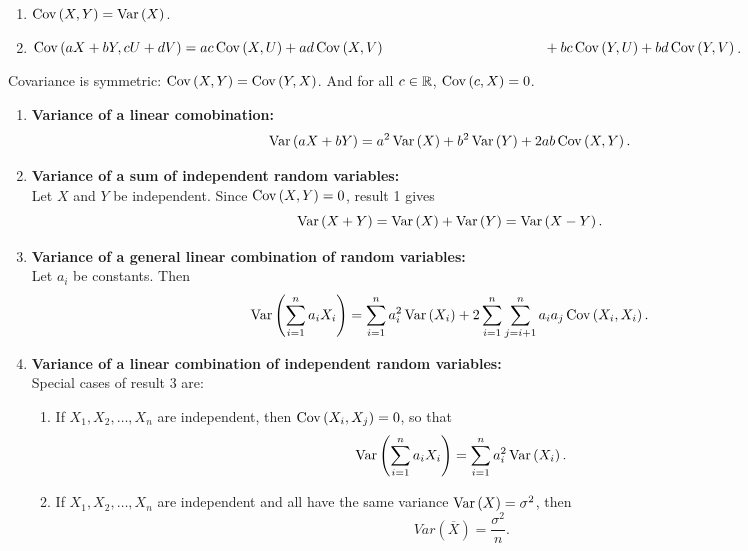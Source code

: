 \begin{theorem}
    \phantom{}
    \begin{enumerate}
        \item $\operatorname{Cov}\left({X,Y}\right) = \operatorname{Var}\left({X}\right)$.
        \item $\Cov{aX+bY,cU+dV} = ac\Cov{X,U} + ad\Cov{X,V} \\ \hspace*{40mm}+ bc\Cov{Y,U} + bd\Cov{Y,V}$.
    \end{enumerate}
\end{theorem}
\begin{note}
    Covariance is symmetric: $\operatorname{Cov}\left({X,Y}\right) = \operatorname{Cov}\left({Y,X}\right)$. And for all $c\in {\mathbb{R}}$, $\operatorname{Cov}\left({c,X}\right) = 0$.
\end{note}

\begin{theorem}
    \phantom{}
    \begin{enumerate}
        \item \textbf{Variance of a linear comobination:} \vspace{-3mm}
        \[
            \operatorname{Var}\left({aX+bY}\right) = a^2\operatorname{Var}\left({X}\right) + b^2\operatorname{Var}\left({Y}\right) + 2ab\operatorname{Cov}\left({X,Y}\right).
        \]
        \item \textbf{Variance of a sum of independent random variables:} \\
        Let $X$ and $Y$ be independent. Since $\operatorname{Cov}\left({X,Y}\right) = 0$, result 1 gives \vspace{-3mm}
        \[
            \operatorname{Var}\left({X+Y}\right) = \operatorname{Var}\left({X}\right) + \operatorname{Var}\left({Y}\right) = \operatorname{Var}\left({X-Y}\right).
        \]
        \item \textbf{Variance of a general linear combination of random variables:} \\
        Let $a_i$ be constants. Then \vspace{-3mm}
        \[
            \operatorname{Var}\left({\displaystyle \sum_{i=1}^{n} a_iX_i}\right) = \displaystyle \sum_{i=1}^{n} a_i^2\operatorname{Var}\left({X_i}\right) + 2\displaystyle \sum_{i=1}^{n} \sum_{j=i+1}^{n} a_i a_j \operatorname{Cov}\left({X_i,X_i}\right). 
        \]
        \pagebreak
        \item \textbf{Variance of a linear combination of independent random variables:} \\
        Special cases of result 3 are:
        \begin{enumerate}
            \item If $X_1, X_2, \ldots, X_n$ are independent, then $\operatorname{Cov}\left({X_i,X_j}\right) = 0$, so that \vspace{-3mm}
            \[
                \operatorname{Var}\left({\displaystyle \sum_{i=1}^{n} a_iX_i}\right) = \displaystyle \sum_{i=1}^{n} a_i^2\operatorname{Var}\left({X_i}\right).
            \]
            \item If $X_1, X_2, \ldots, X_n$ are independent and all have the same variance $\operatorname{Var}\left({X}\right) = \sigma^2$, then \vspace{-3mm}
            \[
                Var{\left( \overline{X} \right)} = \frac{\sigma^2}{n}.
            \]
        \end{enumerate}
    \end{enumerate}
\end{theorem}


